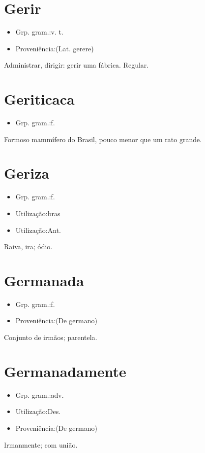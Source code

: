 \section{Gerir}
\begin{itemize}
\item {Grp. gram.:v. t.}
\end{itemize}
\begin{itemize}
\item {Proveniência:(Lat. \textunderscore gerere\textunderscore )}
\end{itemize}
Administrar, dirigir: \textunderscore gerir uma fábrica\textunderscore .
Regular.
\section{Geriticaca}
\begin{itemize}
\item {Grp. gram.:f.}
\end{itemize}
Formoso mammífero do Brasil, pouco menor que um rato grande.
\section{Geriza}
\begin{itemize}
\item {Grp. gram.:f.}
\end{itemize}
\begin{itemize}
\item {Utilização:bras}
\end{itemize}
\begin{itemize}
\item {Utilização:Ant.}
\end{itemize}
Raiva, ira; ódio.
\section{Germanada}
\begin{itemize}
\item {Grp. gram.:f.}
\end{itemize}
\begin{itemize}
\item {Proveniência:(De \textunderscore germano\textunderscore )}
\end{itemize}
Conjunto de irmãos; parentela.
\section{Germanadamente}
\begin{itemize}
\item {Grp. gram.:adv.}
\end{itemize}
\begin{itemize}
\item {Utilização:Des.}
\end{itemize}
\begin{itemize}
\item {Proveniência:(De \textunderscore germano\textunderscore )}
\end{itemize}
Irmanmente; com união.
